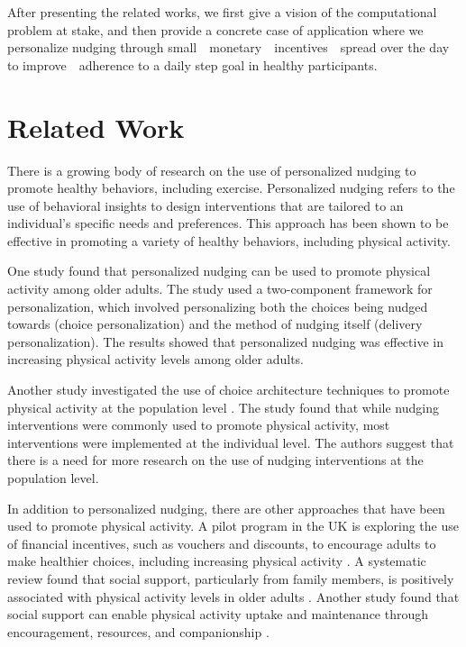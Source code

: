 \documentclass[manuscript,screen,review]{acmart}
\begin{document}
After presenting the related works, we first give a vision of the computational problem at stake, and then
provide a concrete case of application where we personalize nudging through small　monetary　incentives　spread over the day to improve　adherence to a daily step goal in healthy participants.


\section{Related Work}

There is a growing body of research on the use of personalized nudging to promote healthy behaviors, including exercise.
Personalized nudging refers to the use of behavioral insights to design interventions that are tailored to an individual’s
specific needs and preferences\cite{mills_2022}. This approach has been shown to be effective in promoting a variety
of healthy behaviors, including physical activity\cite{forberger2019nudging}.

One study found that personalized nudging can be used to promote physical activity among older
adults\cite{room2017interventions}. The study used a two-component framework for personalization, which involved
personalizing both the choices being nudged towards (choice personalization) and the method of nudging itself
(delivery personalization). The results showed that personalized nudging was effective in increasing physical activity levels among older adults.

Another study investigated the use of choice architecture techniques to promote physical activity at the population
level \cite{forberger2019nudging}. The study found that while nudging interventions were commonly used to promote
physical activity, most interventions were implemented at the individual level. The authors suggest that there is a need for more research on the use of nudging interventions at the population level.

In addition to personalized nudging, there are other approaches that have been used to promote physical activity. A
pilot program in the UK is exploring the use of financial incentives, such as vouchers and discounts, to encourage
adults to make healthier choices, including increasing physical activity \cite{govuk2021}.
A systematic review found that social support, particularly from family members, is positively associated with
physical activity levels in older adults \cite{lindsay2017association}. Another study found that social support can enable physical activity
uptake and maintenance through encouragement, resources, and companionship \cite{smith2023relationship}.
\end{document}

